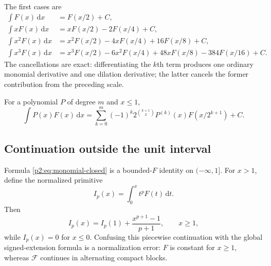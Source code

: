 \documentclass[11pt,oneside]{article}
\theoremstyle{definition}
\theoremstyle{remark}
\newcommand{\dd}{\,\mathrm d}
\newcommand{\1}{\mathbf 1}
\begin{document}
The first cases are
\begin{align}
 \int F(x)\dd x
 &=F(x/2)+C,                                                \label{p2:eq:p0}\\
 \int xF(x)\dd x
 &=xF(x/2)-2F(x/4)+C,                                      \label{p2:eq:p1}\\
 \int x^2F(x)\dd x
 &=x^2F(x/2)-4xF(x/4)+16F(x/8)+C,                          \label{p2:eq:p2}\\
 \int x^3F(x)\dd x
 &=x^3F(x/2)-6x^2F(x/4)+48xF(x/8)-384F(x/16)+C.            \label{p2:eq:p3}
\end{align}
The cancellations are exact: differentiating the $k$th term produces one
ordinary monomial derivative and one dilation derivative; the latter cancels
the former contribution from the preceding scale.

\begin{corollary}
\label{p2:cor:polynomial}
For a polynomial $P$ of degree $m$ and $x\le1$,
\begin{equation}
 \boxed{
 \int P(x)F(x)\dd x=
 \sum_{k=0}^{m}(-1)^k2^{\binom{k+1}{2}}
 P^{(k)}(x)F(x/2^{k+1})+C.}                                \label{p2:eq:polynomial-closed}
\end{equation}
\end{corollary}

\subsection{Continuation outside the unit interval}
Formula \eqref{p2:eq:monomial-closed} is a bounded-$F$ identity on
$(-\infty,1]$.
For $x>1$, define the normalized primitive
\begin{equation}
 I_p(x)=\int_0^xt^pF(t)\dd t.                              \label{p2:eq:Ip-def-int}
\end{equation}
Then
\begin{equation}
 I_p(x)=I_p(1)+\frac{x^{p+1}-1}{p+1},\qquad x\ge1,         \label{p2:eq:Ip-outside}
\end{equation}
while $I_p(x)=0$ for $x\le0$.  Confusing this piecewise continuation with the
global signed-extension formula is a normalization error: $F$ is constant for
$x\ge1$, whereas $\mathcal F$ continues in alternating compact blocks.
\end{document}

